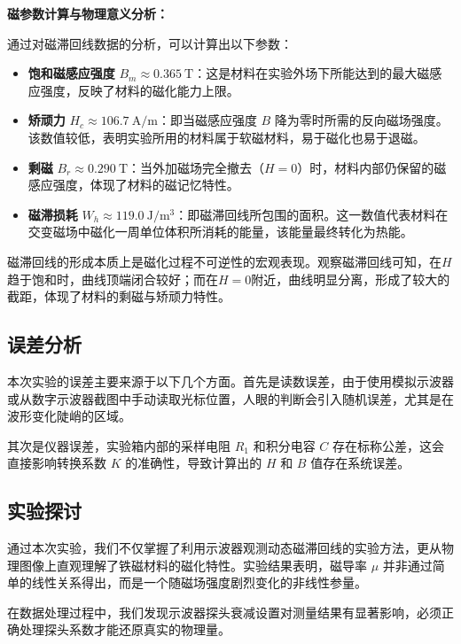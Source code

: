 \documentclass{../template/Report}%
\begin{document}
\begin{fullreportonly}
    \textbf{磁参数计算与物理意义分析：}

    通过对磁滞回线数据的分析，可以计算出以下参数：
    \begin{itemize}
        \item \textbf{饱和磁感应强度} $B_m \approx \SI{0.365}{\tesla}$：这是材料在实验外场下所能达到的最大磁感应强度，反映了材料的磁化能力上限。
        \item \textbf{矫顽力} $H_c \approx \SI{106.7}{\ampere\per\meter}$：即当磁感应强度 $B$ 降为零时所需的反向磁场强度。该数值较低，表明实验所用的材料属于软磁材料，易于磁化也易于退磁。
        \item \textbf{剩磁} $B_r \approx \SI{0.290}{\tesla}$：当外加磁场完全撤去（$H=0$）时，材料内部仍保留的磁感应强度，体现了材料的磁记忆特性。
        \item \textbf{磁滞损耗} $W_h \approx \SI{119.0}{\joule\per\meter\cubed}$：即磁滞回线所包围的面积。这一数值代表材料在交变磁场中磁化一周单位体积所消耗的能量，该能量最终转化为热能。
    \end{itemize}

    磁滞回线的形成本质上是磁化过程不可逆性的宏观表现。观察磁滞回线可知，在$H$趋于饱和时，曲线顶端闭合较好；而在$H=0$附近，曲线明显分离，形成了较大的截距，体现了材料的剩磁与矫顽力特性。

    \subsection{误差分析}

    本次实验的误差主要来源于以下几个方面。首先是读数误差，由于使用模拟示波器或从数字示波器截图中手动读取光标位置，人眼的判断会引入随机误差，尤其是在波形变化陡峭的区域。

    其次是仪器误差，实验箱内部的采样电阻 $R_1$ 和积分电容 $C$ 存在标称公差，这会直接影响转换系数 $K$ 的准确性，导致计算出的 $H$ 和 $B$ 值存在系统误差。

    \subsection{实验探讨}

    通过本次实验，我们不仅掌握了利用示波器观测动态磁滞回线的实验方法，更从物理图像上直观理解了铁磁材料的磁化特性。实验结果表明，磁导率 $\mu$ 并非通过简单的线性关系得出，而是一个随磁场强度剧烈变化的非线性参量。

    在数据处理过程中，我们发现示波器探头衰减设置对测量结果有显著影响，必须正确处理探头系数才能还原真实的物理量。


\end{fullreportonly}
\end{document}
